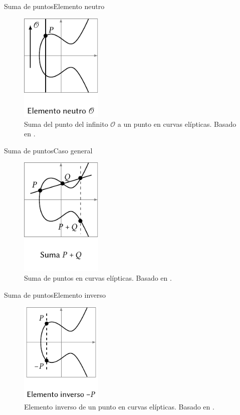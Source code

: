 \documentclass[spanish]{beamer}
\begin{document}
\begin{frame}{Suma de puntos}{Elemento neutro}
  \begin{figure}[h]
    \centering
    \includegraphics[width=0.35\textwidth]{img/neutro-curvas}
    \caption{Suma del punto del infinito \(\mathcal O\) a un punto en curvas elípticas. Basado en  \parencite{eichlseder_elliptic_2016}.}
    \label{fig:duplicar-curvas}
  \end{figure}
\end{frame}

\begin{frame}{Suma de puntos}{Caso general}
  \begin{figure}[h]
    \centering
    \includegraphics[width=0.35\textwidth]{img/suma-curvas}
    \caption{Suma de puntos en curvas elípticas. Basado en  \parencite{eichlseder_elliptic_2016}.}
    \label{fig:suma-curvas}
  \end{figure}
\end{frame}

\begin{frame}{Suma de puntos}{Elemento inverso}
  \begin{figure}[h]
    \centering
    \includegraphics[width=0.35\textwidth]{img/inverso-curvas}
    \caption{Elemento inverso de un punto en curvas elípticas. Basado en  \parencite{eichlseder_elliptic_2016}.}
    \label{fig:inverso-curvas}
  \end{figure}
\end{frame}
\end{document}
